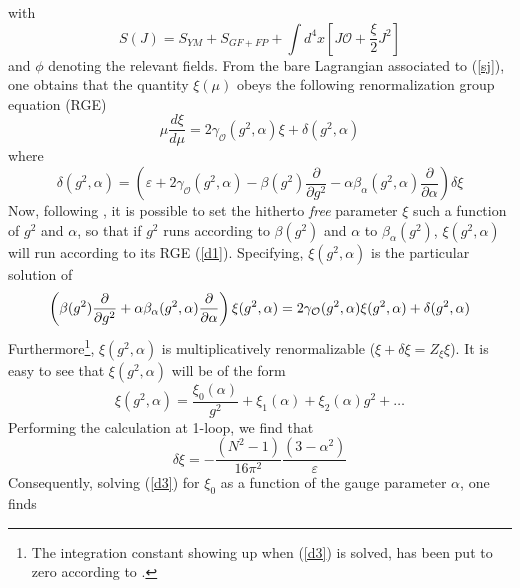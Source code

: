 \documentclass[a4paper,12pt]{article}
\begin{document}
with
\begin{equation}
S(J)=S_{YM}+S_{GF+FP}+\int d^{4}x\left[ J\mathcal{O} +\frac{\xi }{2}%
J^{2}\right]  \label{sj}
\end{equation}
and $\phi$ denoting the relevant fields.\newline
\newline
From the bare Lagrangian associated to (\ref{sj}), one obtains that the
quantity $\xi(\mu)$ obeys the following renormalization group equation (RGE)
\begin{equation}  \label{d1}
\mu\frac{d\xi}{d\mu}=2\gamma_{\mathcal{O}}(g^{2},\alpha)\xi+\delta(g^{2},%
\alpha)
\end{equation}
where
\begin{equation}  \label{d2}
\delta(g^{2},\alpha)=\left(\varepsilon+2\gamma_{\mathcal{O}%
}(g^{2},\alpha)-\beta(g^{2})\frac{\partial }{\partial g^{2}}%
-\alpha\beta_{\alpha}(g^{2},\alpha)\frac{\partial}{\partial\alpha}%
\right)\delta\xi
\end{equation}
Now, following \cite{v1}, it is possible to set the hitherto \emph{free}
parameter $\xi$ such a function of $g^{2}$ and $\alpha$, so that if $g^{2}$
runs according to $\beta(g^{2})$ and $\alpha$ to $\beta_{\alpha}\left(g^{2}%
\right)$, $\xi(g^{2},\alpha)$ will run according to its RGE (\ref{d1}).
Specifying, $\xi(g^{2},\alpha)$ is the particular solution of
\begin{equation}  \label{d3}
\left(\beta(g^{2})\frac{\partial }{\partial g^{2}}+\alpha\beta_{%
\alpha}(g^{2},\alpha)\frac{\partial}{\partial \alpha}\right)\xi(g^{2},%
\alpha)=2\gamma_{\mathcal{O}}(g^{2},\alpha)\xi(g^{2},\alpha)+\delta(g^{2},%
\alpha)
\end{equation}
Furthermore\footnote{%
The integration constant showing up when (\ref{d3}) is solved, has been put
to zero according to \cite{v1}.}, $\xi(g^{2},\alpha)$ is multiplicatively
renormalizable ($\xi+\delta\xi=Z_{\xi}\xi$). It is easy to see that $%
\xi(g^{2},\alpha)$ will be of the form
\begin{equation}  \label{d4}
\xi(g^{2},\alpha)=\frac{\xi_{0}(\alpha)}{g^{2}}+\xi_{1}(\alpha)+\xi_{2}(%
\alpha)g^{2}+\ldots
\end{equation}
Performing the calculation at 1-loop, we find that
\begin{equation}  \label{d5}
\delta\xi=-\frac{\left(N^{2}-1\right)}{16\pi^{2}}\frac{\left(3-\alpha^{2}%
\right)}{\varepsilon}
\end{equation}
Consequently, solving (\ref{d3}) for $\xi_{0}$ as a function of the gauge
parameter $\alpha$, one finds
\end{document}
